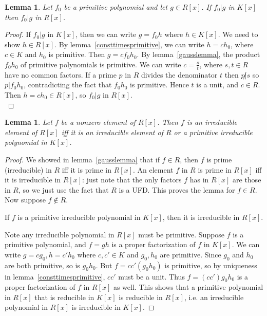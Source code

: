 \documentclass{article}
\theoremstyle{norm}
\newtheorem{lemma}[theorem]{Lemma}
\begin{document}
\begin{lemma}
Let $f_0$ be a primitive polynomial and let $g\in R[x]$. If $f_0|g$ in $K[x]$ then $f_0|g$ in $R[x]$.\\
\end{lemma}
\begin{proof}
If $f_0|g$ in $K[x]$, then we can write $g=f_0h$ where $h\in K[x]$. 
We need to show $h\in R[x]$. By lemma~\ref{consttimesprimitive}, we can write $h=ch_0$, where $c\in K$ and $h_0$ is primitive.  
Then $g=cf_0h_0$. By lemma~\ref{gausslemma}, the product $f_0h_0$ of primitive polynomials is primitive. 
We can write $c=\frac{s}{t}$, where $s,t\in R$ have no common factors. 
If a prime $p$ in $R$ divides the denominator $t$ then 
$p\not|  s$ so $p|f_0h_0$, contradicting the fact that $f_0h_0$ is primitive. 
Hence $t$ is a unit, and $c\in R$. Then $h=ch_0\in R[x]$, so $f_0|g$ in $R[x]$.\\
\end{proof}
\begin{lemma}
Let $f$ be a nonzero element of $R[x]$. Then $f$ is an irreducible element of $R[x]$ iff it is an irreducible element of $R$ or a primitive irreducible polynomial in $K[x]$.
\end{lemma}
\begin{proof}
We showed in lemma~\ref{gausslemma} that if $f\in R$, then $f$ is prime (irreducible) in $R$ iff it is prime in $R[x]$. 
An element $f$ in $R$ is prime in $R[x]$ iff it is irreducible in $R[x]$: just note that the only factors $f$ has in $R[x]$ are those in $R$, so we just use the fact that $R$ is a UFD. This proves the lemma for $f\in R$. Now suppose $f\not\in R$. 

If $f$ is a primitive irreducible polynomial in $K[x]$, then it is irreducible in $R[x]$.

Note any irreducible polynomial in $R[x]$ must be primitive. Suppose $f$ is a primitive polynomial, and $f=gh$ is a proper factorization of $f$ in $K[x]$. We can write $g=cg_0,h=c'h_0$ where $c,c'\in K$ and $g_0,h_0$ are primitive. Since $g_0$ and $h_0$ are both primitive, so is $g_0h_0$. But $f=cc'(g_0h_0)$ is primitive, so by uniqueness in lemma~\ref{consttimesprimitive}, $cc'$ must be a unit. Thus $f=(cc')g_0h_0$ is a proper factorization of $f$ in $R[x]$ as well. This shows that a primitive polynomial in $R[x]$ that is reducible in $K[x]$ is reducible in $R[x]$, i.e. an irreducible polynomial in $R[x]$ is irreducible in $K[x]$.
\end{proof}
\end{document}
